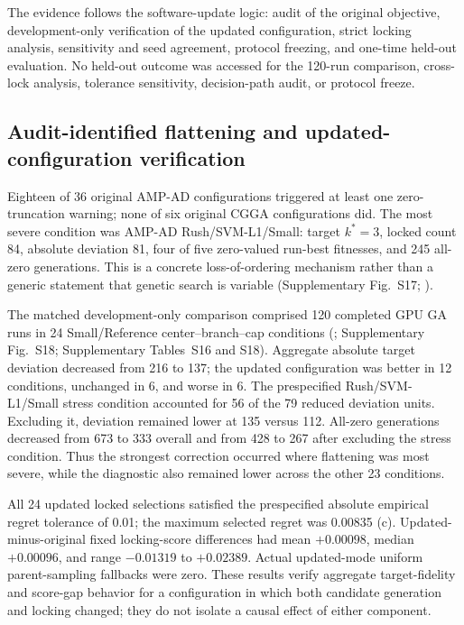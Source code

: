 The evidence follows the software-update logic: audit of the original objective, development-only verification of the updated configuration, strict locking analysis, sensitivity and seed agreement, protocol freezing, and one-time held-out evaluation. No held-out outcome was accessed for the 120-run comparison, cross-lock analysis, tolerance sensitivity, decision-path audit, or protocol freeze.

\subsection{Audit-identified flattening and updated-configuration verification}

Eighteen of 36 original AMP-AD configurations triggered at least one zero-truncation warning; none of six original CGGA configurations did. The most severe condition was AMP-AD Rush/SVM-L1/Small: target \(k^*=3\), locked count 84, absolute deviation 81, four of five zero-valued run-best fitnesses, and 245 all-zero generations. This is a concrete loss-of-ordering mechanism rather than a generic statement that genetic search is variable (Supplementary Fig.~S17; ).



The matched development-only comparison comprised 120 completed GPU GA runs in 24 Small/Reference center--branch--cap conditions (; Supplementary Fig.~S18; Supplementary Tables~S16 and S18). Aggregate absolute target deviation decreased from 216 to 137; the updated configuration was better in 12 conditions, unchanged in 6, and worse in 6. The prespecified Rush/SVM-L1/Small stress condition accounted for 56 of the 79 reduced deviation units. Excluding it, deviation remained lower at 135 versus 112. All-zero generations decreased from 673 to 333 overall and from 428 to 267 after excluding the stress condition. Thus the strongest correction occurred where flattening was most severe, while the diagnostic also remained lower across the other 23 conditions.

All 24 updated locked selections satisfied the prespecified absolute empirical regret tolerance of 0.01; the maximum selected regret was 0.00835 (c). Updated-minus-original fixed locking-score differences had mean \(+0.00098\), median \(+0.00096\), and range \(-0.01319\) to \(+0.02389\). Actual updated-mode uniform parent-sampling fallbacks were zero. These results verify aggregate target-fidelity and score-gap behavior for a configuration in which both candidate generation and locking changed; they do not isolate a causal effect of either component.

